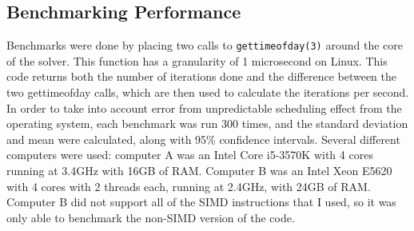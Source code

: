 \subsection{Benchmarking Performance}
Benchmarks were done by placing two calls to \texttt{gettimeofday(3)} around the core of the solver. This function has a
granularity of 1 microsecond on Linux\cite{gtod}. This code returns
both the number of iterations done and the difference between the two gettimeofday calls, which are then used to calculate
the iterations per second. In order to take into account error from unpredictable scheduling effect from the operating system,
each benchmark was run 300 times, and the standard deviation and mean were calculated, along with 95\% confidence intervals. Several different computers were used:
computer A was an Intel Core i5-3570K with 4 cores running at 3.4GHz with 16GB of RAM. Computer B was an Intel Xeon E5620
with 4 cores with 2 threads each, running at 2.4GHz, with 24GB of RAM. Computer B did not support all of the SIMD instructions
that I used, so it was only able to benchmark the non-SIMD version of the code.

